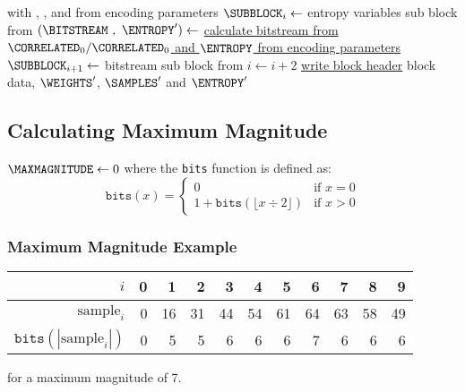 {{\begin{algorithm}[H]
{{  with \TERMS, \DELTAS, \WEIGHTS and \SAMPLES from encoding parameters}\;
  \BlankLine
  $\text{\SUBBLOCK}_i \leftarrow$ entropy variables sub block from \ENTROPY\;
  $(\text{\BITSTREAM}~,~\text{\ENTROPY}') \leftarrow$ \hyperref[wavpack:write_bitstream]{calculate bitstream from $\text{\CORRELATED}_0/\text{\CORRELATED}_0$\newline
  and $\text{\ENTROPY}$ from encoding parameters}\;
  $\text{\SUBBLOCK}_{i + 1} \leftarrow$ bitstream sub block from \BITSTREAM\;
}
$i \leftarrow i + 2$\;
\BlankLine
\hyperref[wavpack:write_block_header]{write block header}\;
\Return block data, $\text{\WEIGHTS}'$, $\text{\SAMPLES}'$ and $\text{\ENTROPY}'$
\end{algorithm}
}

\clearpage

\subsection{Calculating Maximum Magnitude}
\label{wavpack:maximum_magnitude}
{
$\text{\MAXMAGNITUDE} \leftarrow 0$\;
\Return \MAXMAGNITUDE\;
\EALGORITHM
where the \texttt{bits} function is defined as:
\begin{equation*}
\texttt{bits}(x) =
\begin{cases}
0 & \text{if } x = 0 \\
1 + \texttt{bits}(\lfloor x \div 2 \rfloor) & \text{if } x > 0
\end{cases}
\end{equation*}
}
\subsubsection{Maximum Magnitude Example}
\begin{table}[h]
{
\begin{tabular}{r|rrrrrrrrrr}
$i$ & 0 & 1 & 2 & 3 & 4 & 5 & 6 & 7 & 8 & 9 \\
\hline
$\text{sample}_i$ & 0 & 16 & 31 & 44 & 54 & 61 & 64 & 63 & 58 & 49 \\
$\texttt{bits}(|\text{sample}_i|)$ & 0 & 5 & 5 & 6 & 6 & 6 & 7 & 6 & 6 & 6
\end{tabular}
}
\end{table}
\par
\noindent
for a maximum magnitude of 7.

}
